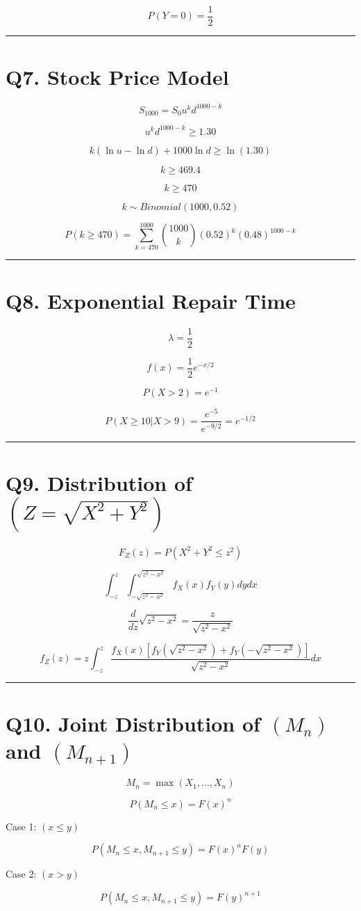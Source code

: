 \documentclass[12pt]{article}
\begin{document}
\[
P(Y=0)=\frac12
\]

\hrule
\vspace{1em}

\section*{Q7. Stock Price Model}

\[
S_{1000}=S_0 u^k d^{1000-k}
\]

\[
u^k d^{1000-k}\ge1.30
\]

\[
k(\ln u-\ln d)+1000\ln d\ge\ln(1.30)
\]

\[
k\ge469.4
\]

\[
k\ge470
\]

\[
k\sim Binomial(1000,0.52)
\]

\[
P(k\ge470)
=
\sum_{k=470}^{1000}
\binom{1000}{k}
(0.52)^k
(0.48)^{1000-k}
\]

\hrule
\vspace{1em}

\section*{Q8. Exponential Repair Time}

\[
\lambda=\frac12
\]

\[
f(x)=\frac12 e^{-x/2}
\]

\[
P(X>2)=e^{-1}
\]

\[
P(X\ge10|X>9)
=
\frac{e^{-5}}{e^{-9/2}}
=
e^{-1/2}
\]

\hrule
\vspace{1em}

\section*{Q9. Distribution of $(Z=\sqrt{X^2+Y^2})$}

\[
F_Z(z)=P(X^2+Y^2\le z^2)
\]

\[
\int_{-z}^{z}
\int_{-\sqrt{z^2-x^2}}^{\sqrt{z^2-x^2}}
f_X(x)f_Y(y)dydx
\]

\[
\frac{d}{dz}\sqrt{z^2-x^2}
=
\frac{z}{\sqrt{z^2-x^2}}
\]

\[
f_Z(z)
=
z
\int_{-z}^z
\frac{
f_X(x)
\left[
f_Y(\sqrt{z^2-x^2})
+
f_Y(-\sqrt{z^2-x^2})
\right]
}
{\sqrt{z^2-x^2}}
dx
\]

\hrule
\vspace{1em}

\section*{Q10. Joint Distribution of $(M_n)$ and $(M_{n+1})$}

\[
M_n=\max(X_1,\dots,X_n)
\]

\[
P(M_n\le x)=F(x)^n
\]

Case 1: $(x\le y)$

\[
P(M_n\le x,M_{n+1}\le y)
=
F(x)^nF(y)
\]

Case 2: $(x>y)$

\[
P(M_n\le x,M_{n+1}\le y)
=
F(y)^{n+1}
\]
\end{document}
